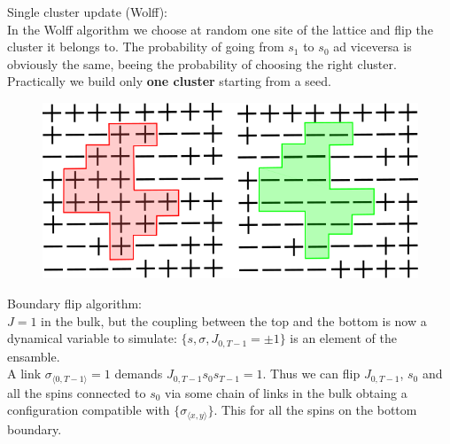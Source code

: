 \documentclass[12pt,handout]{beamer}
\begin{document}
\begin{frame}
\begin{center}
{
\Large Single cluster update (Wolff):\\
}
\vspace{10pt}
In the Wolff algorithm we choose at random one site of the lattice and flip the cluster it belongs to. The probability of going from $s_1$ to $s_0$ ad viceversa is obviously the same, beeing the probability of choosing the right cluster. %
Practically we build only \textbf{one cluster} starting from a seed.\\

\begin{figure}[!htb]
\centering
\includegraphics[scale=0.4]{wolff.png}
\end{figure}


\end{center}
\end{frame}

\begin{frame}
\begin{center}

{\Large Boundary flip algorithm:\\}
\vspace{20pt}
$J = 1$ in the bulk, but the coupling between the top and the bottom is now a dynamical variable to simulate: $\lbrace s, \sigma, J_{0, T-1} = \pm 1 \rbrace$ is an element of the ensamble.\\
\vspace{20pt}
A link $\sigma_{\langle 0, T-1 \rangle} = 1$ demands $J_{0, T-1} s_0 s_{T-1} = 1$. Thus we can flip $J_{0, T-1}$, $s_0$ and all the spins connected to $s_0$ via some chain of links in the bulk obtaing a configuration compatible with $\lbrace \sigma_{\langle x, y \rangle} \rbrace $. This for all the spins on the bottom boundary.

\end{center}
\end{frame}
\end{document}

